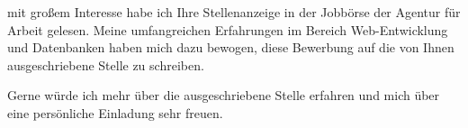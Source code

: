 \documentclass[a4paper,12pt]{g-brief}
\begin{document}
\begin{g-brief}
mit gro\ss{}em Interesse habe ich Ihre Stellenanzeige in der Jobb\"orse der Agentur f\"ur Arbeit gelesen.
Meine umfangreichen Erfahrungen im Bereich Web-Entwicklung und Datenbanken haben mich dazu bewogen, diese Bewerbung auf die von Ihnen ausgeschriebene Stelle zu schreiben.

Gerne w\"urde ich mehr \"uber die ausgeschriebene Stelle erfahren
und mich \"uber eine pers\"onliche Einladung sehr freuen.
\end{g-brief}
\end{document}

